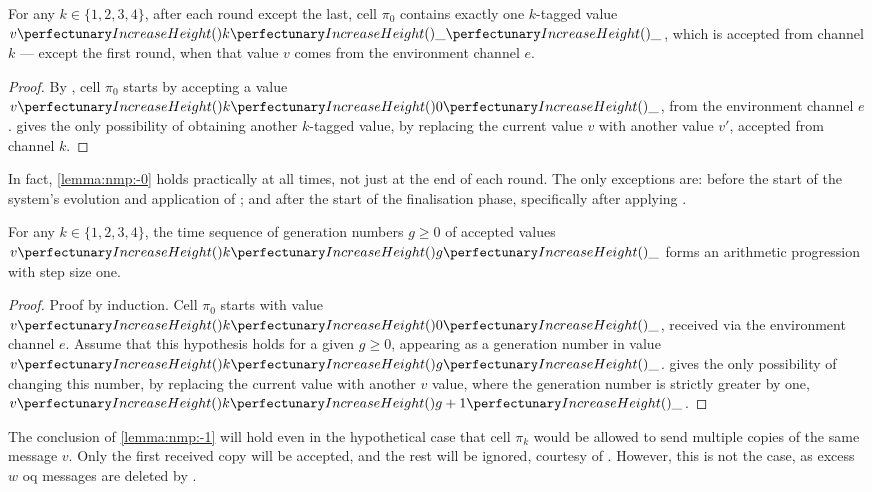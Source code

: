 \begin{lemma}\label{lemma:nmp:-0}
    For any $k \in \{ 1, 2, 3, 4 \}$, after each round except the last,
    cell $\pi_0$ contains exactly one $k$-tagged value $\cpvv{k}{\cpdiscard}{\cpdiscard}$, 
    which is accepted from channel $k$ 
    --- except the first round, when that value $v$ comes from the environment channel $e$.
\end{lemma}

\begin{proof}
    By , cell $\pi_0$ starts by accepting a value $\cpvv{k}{0}{\cpdiscard}$, from the environment channel $e$.
     gives the only possibility of obtaining another $k$-tagged value, by replacing the current value $v$ with another value $v'$, accepted from channel $k$.
\end{proof}

\begin{remark}
    In fact, \cref{lemma:nmp:-0} holds practically at all times, not just at the end of each round.  The only exceptions are: before the start of the system's evolution and application of ; and after the start of the finalisation phase, specifically after applying .
\end{remark}

\begin{lemma}\label{lemma:nmp:-1}
    For any $k \in \{ 1, 2, 3, 4 \}$, the time sequence of generation numbers $g \geq 0$ of accepted values $\cpvv{k}{g}{\cpdiscard}$ forms an arithmetic progression with step size one.
\end{lemma}

\begin{proof}
    Proof by induction. Cell $\pi_0$ starts with value $\cpvv{k}{0}{\cpdiscard}$, received via the environment channel $e$.
    Assume that this hypothesis holds for a given $g \geq 0$, appearing as a generation number in value $\cpvv{k}{g}{\cpdiscard}$.  gives the only possibility of changing this number, by replacing the current value with another $v$ value, where the generation number is strictly greater by one, 
    $\cpvv{k}{g+1}{\cpdiscard}$.
\end{proof}

\begin{remark}\label{remark:nmp:-1}
The conclusion of \cref{lemma:nmp:-1} will hold even in the hypothetical case that cell $\pi_k$ would be allowed to send multiple copies of the same message $v$. 
Only the first received copy will be accepted, and the rest will be ignored,
courtesy of . However, this is not the case, as excess \(w\) \gls{oq} messages are deleted by . 
\end{remark}

